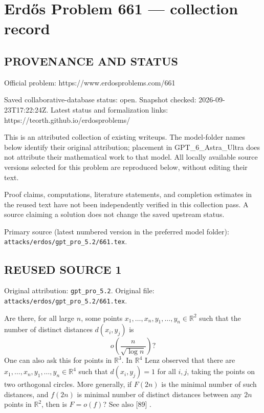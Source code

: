 \section*{Erd\H{o}s Problem 661 --- collection record}

\subsection*{PROVENANCE AND STATUS}
Official problem: https://www.erdosproblems.com/661

Saved collaborative-database status: open.
Snapshot checked: 2026-09-23T17:22:24Z.
Latest status and formalization links: https://teorth.github.io/erdosproblems/

This is an attributed collection of existing writeups. The model-folder names below identify their original attribution; placement in GPT\_6\_Astra\_Ultra does not attribute their mathematical work to that model. All locally available source versions selected for this problem are reproduced below, without editing their text.

Proof claims, computations, literature statements, and completion estimates in the reused text have not been independently verified in this collection pass. A source claiming a solution does not change the saved upstream status.

Primary source (latest numbered version in the preferred model folder): \texttt{attacks/erdos/gpt\_pro\_5.2/661.tex}.

\subsection*{REUSED SOURCE 1}
Original attribution: \texttt{gpt\_pro\_5.2}.
Original file: \texttt{attacks/erdos/gpt\_pro\_5.2/661.tex}.


Are there, for all large $n$, some points $x_1,\ldots,x_n,y_1,\ldots,y_n\in \mathbb{R}^2$ such that the number of distinct distances $d(x_i,y_j)$ is\[o\left(\frac{n}{\sqrt{\log n}}\right)?\] One can also ask this for points in $\mathbb{R}^3$. In $\mathbb{R}^4$ Lenz observed that there are $x_1,\ldots,x_n,y_1,\ldots,y_n\in \mathbb{R}^4$ such that $d(x_i,y_j)=1$ for all $i,j$, taking the points on two orthogonal circles. More generally, if $F(2n)$ is the minimal number of such distances, and $f(2n)$ is minimal number of distinct distances between any $2n$ points in $\mathbb{R}^2$, then is $F =o(f)$? See also [89] .



